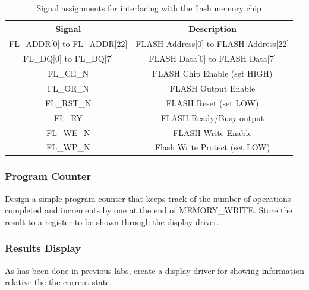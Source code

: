 \begin {table}[H]
	\caption {Signal assignments for interfacing with the flash memory chip} 
	\label{tab:flash} 
	\begin{center}
    		\begin{tabular}{ | c | c |}
			\hline
 			{\bf Signal} & {\bf Description} \\ \hline
			FL\_ADDR[0] to FL\_ADDR[22] & FLASH Address[0] to FLASH Address[22] \\ \hline
			FL\_DQ[0] to FL\_DQ[7] & FLASH Data[0] to FLASH Data[7] \\ \hline
			FL\_CE\_N & FLASH Chip Enable (set HIGH)\\ \hline
			FL\_OE\_N & FLASH Output Enable \\ \hline
			FL\_RST\_N & FLASH Reset (set LOW)\\ \hline
			FL\_RY & FLASH Ready/Busy output \\ \hline
			FL\_WE\_N & FLASH Write Enable \\ \hline
			FL\_WP\_N & Flash Write Protect (set LOW)\\ 
			\hline
    		\end{tabular}
	\end{center}
\end{table}

\subsubsection{Program Counter}

Design a simple program counter that keeps track of the number of operations completed and increments by one at the end of MEMORY\_WRITE. Store the result to a register to be shown through the display driver.

\subsubsection{Results Display}
\label{sec:display}
As has been done in previous labs, create a display driver for showing information relative the the current state.

